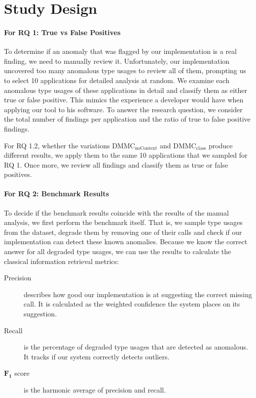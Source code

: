 \section{Study Design}

\paragraph{For RQ 1: True vs False Positives}

To determine if an anomaly that was flagged by our implementation is a real finding, we need to manually review it.
Unfortunately, our implementation uncovered too many anomalous type usages to review all of them, prompting us to select 10 applications for detailed analysis at random.
We examine each anomalous type usages of these applications in detail and classify them as either true or false positive.
This mimics the experience a developer would have when applying our tool to his software.
To answer the research question, we consider the total number of findings per application and the ratio of true to false positive findings.

For RQ 1.2, whether the variations $\text{DMMC}_\text{noContext}$ and $\text{DMMC}_\text{class}$ produce different results, we apply them to the same 10 applications that we sampled for RQ 1.
Once more, we review all findings and classify them as true or false positives.

\paragraph{For RQ 2: Benchmark Results}

To decide if the benchmark results coincide with the results of the manual analysis, we first perform the benchmark itself.
That is, we sample type usages from the dataset, degrade them by removing one of their calls and check if our implementation can detect these known anomalies.
Because we know the correct answer for all degraded type usages, we can use the results to calculate the classical information retrieval metrics:
\begin{description}
    \item [Precision] describes how good our implementation is at suggesting the correct missing call. It is calculated as the weighted confidence the system places on its suggestion.
    \item [Recall] is the percentage of degraded type usages that are detected as anomalous. It tracks if our system correctly detects outliers.
    \item [$\mathbf{F_1}$ score] is the harmonic average of precision and recall.
\end{description}

